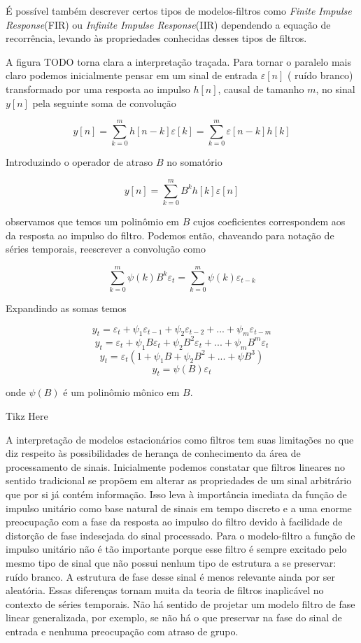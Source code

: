 É possível também descrever certos tipos de modelos-filtros como \emph{Finite
Impulse Response}(FIR) ou \emph{Infinite Impulse Response}(IIR) dependendo
a equação de recorrência, levando às propriedades conhecidas desses tipos de
filtros.

A figura TODO torna clara a interpretação traçada. Para tornar o paralelo mais
claro podemos inicialmente pensar em um sinal de entrada $\varepsilon[n]$ (
ruído branco) transformado por uma resposta ao impulso $h[n]$, causal de
tamanho $m$, no sinal $y[n]$ pela seguinte soma de convolução

$$ y[n] = \sum^{m}_{k=0} h[n-k]\varepsilon[k] =  \sum^{m}_{k=0} \varepsilon[n-k]h[k]$$

Introduzindo o operador de atraso $B$ no somatório

$$ y[n] = \sum^{m}_{k=0} B^{k}h[k] \varepsilon[n]$$

observamos que temos um polinômio em $B$ cujos coeficientes correspondem aos
da resposta ao impulso do filtro. Podemos então, chaveando para notação de
séries temporais, reescrever a convolução como

$$ \sum^{m}_{k=0} \psi(k)B^k\varepsilon_{t} = \sum^{m}_{k=0} \psi(k)\varepsilon_{t-k}$$

Expandindo as somas temos

$$ y_t = \varepsilon_t + \psi_1 \varepsilon_{t-1} + \psi_2 \varepsilon_{t-2} + ... +  \psi_m \varepsilon_{t-m}$$
$$ y_t = \varepsilon_t + \psi_1 B\varepsilon_{t} + \psi_2 B^2 \varepsilon_{t} + ... +  \psi_m B^m \varepsilon_{t}$$
$$ y_t = \varepsilon_t(1 + \psi_1 B + \psi_2 B^2 + ... + \psi B^3)$$
$$ y_t = \psi(B)\varepsilon_t$$

onde $\psi(B)$ é um polinômio mônico em $B$.

Tikz Here


A interpretação de modelos estacionários como filtros tem suas limitações no
que diz respeito às possibilidades de herança de conhecimento da área de
processamento de sinais. Inicialmente podemos constatar que filtros lineares no
sentido tradicional se propõem em alterar as propriedades de um sinal
arbitrário que por si já contém informação. Isso leva à importância imediata da
função de impulso unitário como base natural de sinais em tempo discreto e a
uma enorme preocupação com a fase da resposta ao impulso do filtro devido à
facilidade de distorção de fase indesejada do sinal processado. Para o
modelo-filtro a função de impulso unitário não é tão importante porque esse
filtro é sempre excitado pelo mesmo tipo de sinal que não possui nenhum tipo de
estrutura a se preservar: ruído branco. A estrutura de fase desse sinal é menos
relevante ainda por ser aleatória. Essas diferenças tornam muita da teoria de
filtros inaplicável no contexto de séries temporais. Não há sentido de projetar
um modelo filtro de fase linear generalizada, por exemplo, se não há o que
preservar na fase do sinal de entrada e nenhuma preocupação com atraso de grupo.

